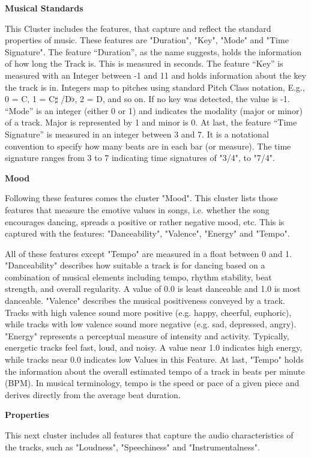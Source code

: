 \textbf{Musical Standards}

This Cluster includes the features, that capture and reflect the standard properties of music. 
These features are "Duration", "Key", "Mode" and "Time Signature". 
The feature “Duration”, as the name suggests, holds the information of how long the Track is.
This is measured in seconds. The feature “Key” is measured with an Integer between -1 and 11 and 
holds information about the key the track is in. Integers map to pitches using standard Pitch Class notation, E.g., 0 = C, 1 = C\(\sharp\) /D\(\flat\), 2 = D, and so on. 
If no key was detected, the value is -1.
“Mode” is an integer (either 0 or 1) and indicates the modality (major or minor) of a track. Major is represented by 1 and minor is 0. 
At last, the feature “Time Signature” is measured in an integer between 3 and 7.
It is a notational convention to specify how many beats are in each bar (or measure). 
The time signature ranges from 3 to 7 indicating time signatures of "3/4", to "7/4".

\textbf{Mood}

Following these features comes the cluster "Mood".
This cluster lists those features that measure the emotive values in songs, 
i.e. whether the song encourages dancing, spreads a positive or rather negative mood,
etc. This is captured with the features: "Danceability", "Valence", "Energy" and "Tempo".

All of these features except "Tempo" are measured in a float between 0 and 1. 
"Danceability" describes how suitable a track is for dancing based on a combination of musical elements
including tempo, rhythm stability, beat strength, and overall regularity. A value of 0.0 is least danceable and 1.0 is most danceable.
"Valence" describes the musical positiveness conveyed by a track. 
Tracks with high valence sound more positive (e.g. happy, cheerful, euphoric),
while tracks with low valence sound more negative (e.g. sad, depressed, angry).  
"Energy" represents a perceptual measure of intensity and activity. Typically, energetic tracks feel fast, loud, and noisy. 
A value near 1.0 indicates high energy, while tracks near 0.0 indicates low Values in this Feature. 
At last, "Tempo" holds the information about the overall estimated tempo of a track in beats per
minute (BPM). In musical terminology, tempo is the speed or pace of a given piece and derives directly from the
average beat duration.

\textbf{Properties}

This next cluster includes all features that capture the audio characteristics of the tracks,
such as "Loudness", "Speechiness" and "Instrumentalness".

